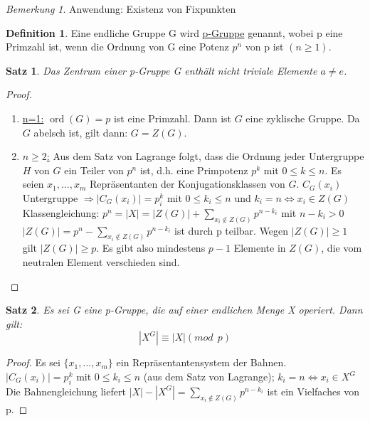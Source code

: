 \documentclass[12pt]{scrartcl}%
\newtheorem{thm}{Satz}
\theoremstyle{definition}
\newtheorem*{defn}{Definition}
\theoremstyle{remark}
\newtheorem*{nb}{Bemerkung}
\DeclareMathOperator\ord{ord}
\begin{document}
\begin{nb}
Anwendung: Existenz von Fixpunkten
\end{nb}

\begin{defn} 
Eine endliche Gruppe G wird \underline{p-Gruppe} genannt, wobei p eine Primzahl ist, wenn die Ordnung von G eine Potenz $p^n$ von p ist $(n\geq 1)$.
\end{defn}

\begin{thm}
Das Zentrum einer p-Gruppe G enthält nicht triviale Elemente $a \neq e$.
\end{thm}

\begin{proof}
\begin{enumerate}
\item \underline{n=1:} \(\ord(G)=p\) ist eine Primzahl. Dann ist \(G\) eine zyklische Gruppe. Da \(G\) abelsch ist, gilt dann: \(G=Z(G)\).
\item \underline{$n\geq 2$:} Aus dem Satz von Lagrange folgt, dass die Ordnung jeder Untergruppe $H$ von $G$ ein Teiler von $p^n$ ist, d.h. eine Primpotenz $p^k$ mit $0\leq k\leq n$. Es seien $x_{1},...,x_{m}$ Repräsentanten der Konjugationsklassen von $G$.
$C_{G}(x_{i})$ Untergruppe $\Rightarrow |C_{G}(x_{i})|=p^k_{i}$ mit $0\leq k_{i} \leq n$ und $k_{i}=n \Leftrightarrow x_{i} \in Z(G)$  \\
Klassengleichung: $p^n=|X|=|Z(G)|+\sum_{x_{i}\notin Z(G)}p^{n-k_{i}}$ mit $n-k_{i}>0$ \\
$|Z(G)|= p^n-\sum_{x_{i}\notin Z(G)}p^{n-k_{i}}$ ist durch p teilbar. Wegen $|Z(G)|\geq 1$ gilt $|Z(G)|\geq p$. Es gibt also mindestens $p-1$ Elemente in $Z(G)$, die vom neutralen Element verschieden sind.
\end{enumerate}
\end{proof}

\begin{thm}
Es sei G eine p-Gruppe, die auf einer endlichen Menge X operiert. Dann gilt:
\begin{equation*}
|X^G|\equiv |X|(mod\ \ p)
\end{equation*}
\end{thm}

\begin{proof}
Es sei $\{x_{1},...,x_{m}\}$ ein Repräsentantensystem der Bahnen. \\
$|C_{G}(x_{i})|=p^k_{i}$ mit $0\leq k_{i} \leq n$ (aus dem Satz von Lagrange); $k_{i}=n\Leftrightarrow x_{i} \in X^G$ \\
Die Bahnengleichung liefert $|X|-|X^G|=\sum_{x_{i}\notin Z(G)}p^{n-k_{i}}$ ist ein Vielfaches von p.
\end{proof}
\end{document}
